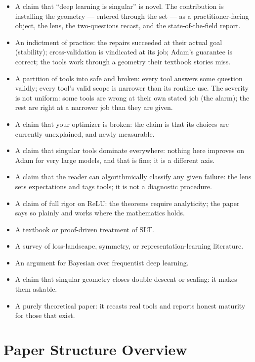 \documentclass[11pt]{article}
\begin{document}
\begin{itemize}[itemsep=4pt]
\item A claim that ``deep learning is singular'' is novel. The
      contribution is installing the geometry --- entered through the
      set --- as a practitioner-facing object, the lens, the
      two-questions recast, and the state-of-the-field report.
\item An indictment of practice: the repairs succeeded at their
      actual goal (stability); cross-validation is vindicated at its
      job; Adam's guarantee is correct; the tools work through a
      geometry their textbook stories miss.
\item A partition of tools into safe and broken: every tool answers
      some question validly; every tool's valid scope is narrower than
      its routine use. The severity is not uniform: some tools are
      wrong at their own stated job (the alarm); the rest are right at
      a narrower job than they are given.
\item A claim that your optimizer is broken: the claim is that its
      choices are currently unexplained, and newly measurable.
\item A claim that singular tools dominate everywhere: nothing here
      improves on Adam for very large models, and that is fine; it is
      a different axis.
\item A claim that the reader can algorithmically classify any given
      failure: the lens sets expectations and tags tools; it is not a
      diagnostic procedure.
\item A claim of full rigor on ReLU: the theorems require
      analyticity; the paper says so plainly and works where the
      mathematics holds.
\item A textbook or proof-driven treatment of SLT.
\item A survey of loss-landscape, symmetry, or representation-learning
      literature.
\item An argument for Bayesian over frequentist deep learning.
\item A claim that singular geometry closes double descent or scaling:
      it makes them askable.
\item A purely theoretical paper: it recasts real tools and reports
      honest maturity for those that exist.
\end{itemize}

\section{Paper Structure Overview}
\end{document}

